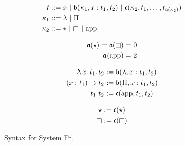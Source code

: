
\begin{figure}
    \centering
    \begin{align*}
        t &::= x\ |\ \mathfrak{b}(\kappa_1, x : t_1, t_2)\ |\ \mathfrak{c}(\kappa_2, t_1, \ldots, t_{\mathfrak{a}(\kappa_2)}) \\
        \kappa_1 &::= \lambda\ |\ \Pi \\
        \kappa_2 &::=\star\ |\ \kind\ |\ \text{app}
    \end{align*}%
    \begin{minipage}{0.32\textwidth}
        \vspace{-.2in}
        \begin{align*}
            \mathfrak{a}(\star) = \mathfrak{a}(\kind) &= 0 \\
            \mathfrak{a}(\text{app}) &= 2
        \end{align*}
    \end{minipage}%
    \begin{minipage}{0.32\textwidth}
        \vspace{-.2in}
        \begin{align*}
            {\lambda}\, x\! : \! t_1.\, t_2 &:= \mathfrak{b}(\lambda, x : t_1, t_2) \\
            (x : t_1) \to t_2 &:= \mathfrak{b}(\Pi, x : t_1, t_2) \\
            t_1\ t_2 &:= \mathfrak{c}(\text{app}, t_1, t_2)
        \end{align*}
    \end{minipage}%
    \begin{minipage}{0.32\textwidth}
        \vspace{-.2in}
        \begin{align*}
            \star &:= \mathfrak{c}(\star) \\
            \kind &:= \mathfrak{c}(\kind)
        \end{align*}
    \end{minipage}
    \caption{Syntax for System F$^\omega$.}
    \label{fig:syntax_f}
\end{figure}
